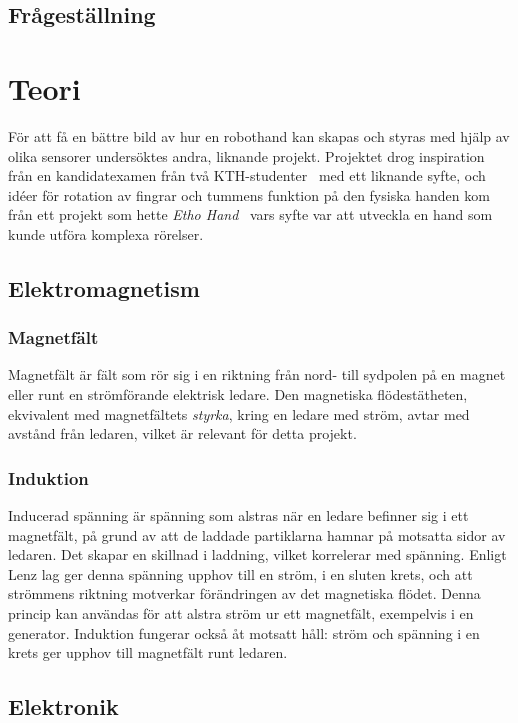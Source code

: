 \documentclass[a4paper]{article}
\begin{document}
\begin{sloppypar}
  \subsection{Frågeställning}

  \section{Teori}
  För att få en bättre bild av hur en robothand kan skapas och styras med hjälp av olika sensorer undersöktes andra, liknande projekt.
  Projektet drog inspiration från en kandidatexamen från två KTH-studenter~\cite{KTHhand} med ett liknande syfte, och
  idéer för rotation av fingrar och tummens funktion på den fysiska handen kom från ett projekt som hette \textit{Etho Hand}~\cite{EthoHand}
  vars syfte var att utveckla en hand som kunde utföra komplexa rörelser.


  \subsection{Elektromagnetism}
  \subsubsection{Magnetfält}
  Magnetfält är fält som rör sig i en riktning från nord- till sydpolen på en magnet eller runt en strömförande elektrisk ledare.
  Den magnetiska flödestätheten, ekvivalent med magnetfältets \textit{styrka}, kring en ledare med ström, avtar med avstånd från ledaren,
  vilket är relevant för detta projekt.~\cite{digilar}
  \subsubsection{Induktion}
  Inducerad spänning är spänning som alstras när en ledare befinner sig i ett magnetfält, på grund av att de laddade partiklarna hamnar på motsatta sidor av ledaren.
  Det skapar en skillnad i laddning, vilket korrelerar med spänning.
  Enligt Lenz lag ger denna spänning upphov till en ström, i en sluten krets, och att strömmens riktning motverkar förändringen av det magnetiska flödet.
  Denna princip kan användas för att alstra ström ur ett magnetfält, exempelvis i en generator.
  Induktion fungerar också åt motsatt håll: ström och spänning i en krets ger upphov till magnetfält runt ledaren.
  ~\cite{digilar}

  \subsection{Elektronik}

\end{sloppypar}
\end{document}
